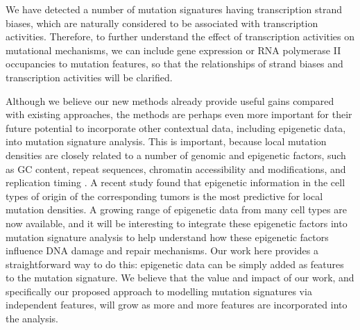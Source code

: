 \documentclass[10pt,letterpaper]{article}
\begin{document}
We have detected a number of mutation signatures having transcription strand biases, 
which are naturally considered to be associated with transcription activities.
Therefore, to further understand the effect of transcription activities on mutational mechanisms, 
we can include gene expression or RNA polymerase II occupancies to mutation features, 
so that the relationships of strand biases and transcription activities will be clarified.


Although we believe our new methods already provide
useful gains compared with existing approaches,
the methods are perhaps even more important for their future potential to incorporate other contextual data, including epigenetic data,
into mutation signature analysis. This is important, because
local mutation densities are closely related to a number of genomic and epigenetic factors, such as GC content, repeat sequences, chromatin accessibility and modifications, and replication timing \cite{pmid22820252, pmid21953857, pmid23422670, pmid23770567}.
A recent study found that epigenetic information in the cell types of origin of the corresponding tumors is the most predictive \cite{pmid25693567} for local mutation densities. A growing range of epigenetic data from many cell types are now available, and it will be interesting to integrate these epigenetic factors into mutation signature analysis to help understand how these epigenetic factors influence DNA damage and repair mechanisms. 
Our work here provides a straightforward way to do this: epigenetic
data can be simply added as features
to the mutation signature. 
We believe that 
the value and impact of our work, and 
specifically our proposed approach to modelling mutation signatures via independent features, will grow as more and more features
are incorporated into the analysis.







\end{document}
